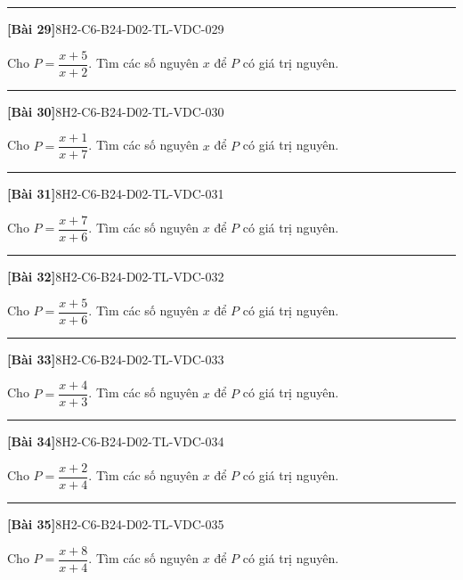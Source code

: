 \documentclass[12pt,a4paper]{article}
\newif\ifloigiai
\newenvironment{cauhoi}[2]{%
  \par\medskip\noindent\rule{\textwidth}{0.4pt}\par\nopagebreak
  \noindent\textbf{[#1]}\hfill{\scriptsize\ttfamily #2}\par\nopagebreak\smallskip}{\par}
\newcommand{\loigiai}[1]{\ifloigiai\par\smallskip\noindent\textit{Lời giải.} #1\par\fi}
\begin{document}
\begin{cauhoi}{Bài 29}{8H2-C6-B24-D02-TL-VDC-029}
Cho $P=\dfrac{x+5}{x+2}$. Tìm các số nguyên $x$ để $P$ có giá trị nguyên.
\loigiai{Viết $P=\dfrac{(x+2)+3}{x+2}=1+\dfrac{3}{x+2}$. $P$ nguyên khi $x+2$ là ước của $3$, tức $x+2\in\{-3; -1; 1; 3\}$. Suy ra $x\in\{-5; -3; -1; 1\}$.}
\end{cauhoi}
\begin{cauhoi}{Bài 30}{8H2-C6-B24-D02-TL-VDC-030}
Cho $P=\dfrac{x+1}{x+7}$. Tìm các số nguyên $x$ để $P$ có giá trị nguyên.
\loigiai{Viết $P=\dfrac{(x+7)-6}{x+7}=1+\dfrac{-6}{x+7}$. $P$ nguyên khi $x+7$ là ước của $-6$, tức $x+7\in\{-6; -3; -2; -1; 1; 2; 3; 6\}$. Suy ra $x\in\{-13; -10; -9; -8; -6; -5; -4; -1\}$.}
\end{cauhoi}
\begin{cauhoi}{Bài 31}{8H2-C6-B24-D02-TL-VDC-031}
Cho $P=\dfrac{x+7}{x+6}$. Tìm các số nguyên $x$ để $P$ có giá trị nguyên.
\loigiai{Viết $P=\dfrac{(x+6)+1}{x+6}=1+\dfrac{1}{x+6}$. $P$ nguyên khi $x+6$ là ước của $1$, tức $x+6\in\{-1; 1\}$. Suy ra $x\in\{-7; -5\}$.}
\end{cauhoi}
\begin{cauhoi}{Bài 32}{8H2-C6-B24-D02-TL-VDC-032}
Cho $P=\dfrac{x+5}{x+6}$. Tìm các số nguyên $x$ để $P$ có giá trị nguyên.
\loigiai{Viết $P=\dfrac{(x+6)-1}{x+6}=1+\dfrac{-1}{x+6}$. $P$ nguyên khi $x+6$ là ước của $-1$, tức $x+6\in\{-1; 1\}$. Suy ra $x\in\{-7; -5\}$.}
\end{cauhoi}
\begin{cauhoi}{Bài 33}{8H2-C6-B24-D02-TL-VDC-033}
Cho $P=\dfrac{x+4}{x+3}$. Tìm các số nguyên $x$ để $P$ có giá trị nguyên.
\loigiai{Viết $P=\dfrac{(x+3)+1}{x+3}=1+\dfrac{1}{x+3}$. $P$ nguyên khi $x+3$ là ước của $1$, tức $x+3\in\{-1; 1\}$. Suy ra $x\in\{-4; -2\}$.}
\end{cauhoi}
\begin{cauhoi}{Bài 34}{8H2-C6-B24-D02-TL-VDC-034}
Cho $P=\dfrac{x+2}{x+4}$. Tìm các số nguyên $x$ để $P$ có giá trị nguyên.
\loigiai{Viết $P=\dfrac{(x+4)-2}{x+4}=1+\dfrac{-2}{x+4}$. $P$ nguyên khi $x+4$ là ước của $-2$, tức $x+4\in\{-2; -1; 1; 2\}$. Suy ra $x\in\{-6; -5; -3; -2\}$.}
\end{cauhoi}
\begin{cauhoi}{Bài 35}{8H2-C6-B24-D02-TL-VDC-035}
Cho $P=\dfrac{x+8}{x+4}$. Tìm các số nguyên $x$ để $P$ có giá trị nguyên.
\loigiai{Viết $P=\dfrac{(x+4)+4}{x+4}=1+\dfrac{4}{x+4}$. $P$ nguyên khi $x+4$ là ước của $4$, tức $x+4\in\{-4; -2; -1; 1; 2; 4\}$. Suy ra $x\in\{-8; -6; -5; -3; -2; 0\}$.}
\end{cauhoi}
\end{document}
